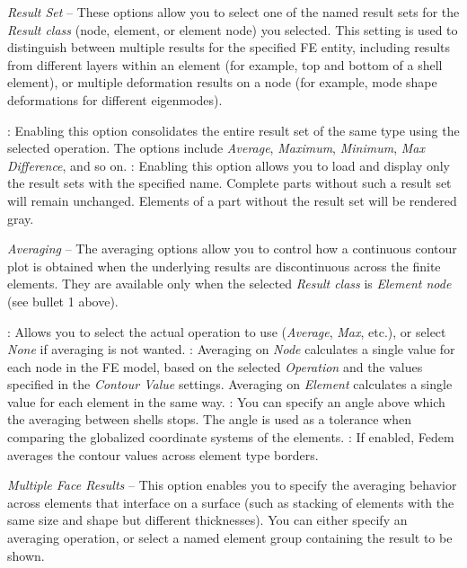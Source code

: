 \begin{bulletlist}
\item{\sl Result Set} --
  These options allow you to select one of the named result sets for the
  {\sl Result class} (node, element, or element node) you selected.
  This setting is used to distinguish between multiple results for the specified
  FE entity, including results from different layers within an element (for
  example, top and bottom of a shell element), or multiple deformation results
  on a node (for example, mode shape deformations for different eigenmodes).

  \begin{itemize}
   :
    Enabling this option consolidates the entire result set of the same type
    using the selected operation. The options include {\sl Average},
    {\sl Maximum}, {\sl Minimum}, {\sl Max Difference}, and so on.
   :
    Enabling this option allows you to load and display only the result sets
    with the specified name.
    Complete parts without such a result set will remain unchanged.
    Elements of a part without the result set will be rendered gray.
  \end{itemize}

\item{\sl Averaging} --
  The averaging options allow you to control how a continuous contour plot is
  obtained when the underlying results are discontinuous across the finite
  elements. They are available only when the selected {\sl Result class} is
  {\sl Element node} (see bullet 1 above).

  \begin{itemize}
   :
    Allows you to select the actual operation to use ({\sl Average}, {\sl Max},
    etc.), or select {\sl None} if averaging is not wanted.
   :
    Averaging on {\sl Node} calculates a single value for each node in the
    FE model, based on the selected {\sl Operation} and the values specified
    in the {\sl Contour Value} settings. Averaging on {\sl Element} calculates
    a single value for each element in the same way.
   :
    You can specify an angle above which the averaging between shells stops.
    The angle is used as a tolerance when comparing the globalized coordinate
    systems of the elements.
   :
    If enabled, Fedem averages the contour values across element type borders.
  \end{itemize}

\item{\sl Multiple Face Results} --
  This option enables you to specify the averaging behavior across elements
  that interface on a surface (such as stacking of elements with the same size
  and shape but different thicknesses). You can either specify an averaging
  operation, or select a named element group containing the result to be shown.


\end{bulletlist}
